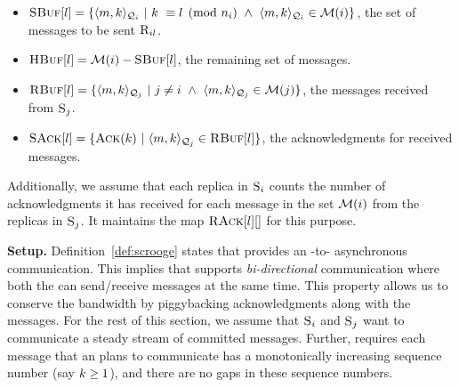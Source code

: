 \begin{itemize}[wide]
\item $\textsc{SBuf}[{l}] = \{\langle m, k\rangle_{\mathcal{Q}_{i}} ~|~ k ~\equiv l \pmod{n_i} ~\wedge ~\langle m, k\rangle_{\mathcal{Q}_{i}} \in \mathcal{M}(i) \}$, the set of messages to be sent $\textsc{R}_{{i}{l}}$.

\item $\textsc{HBuf}[{l}] = \mathcal{M}(i) - \textsc{SBuf}[{l}]$, the remaining set of messages.

\item $\textsc{RBuf}[{l}] = \{\langle m, k\rangle_{\mathcal{Q}_{j}} ~|~ j \neq i ~\wedge ~\langle m, k\rangle_{\mathcal{Q}_{j}} \in \mathcal{M}(j) \}$, the messages received from \RSM{} $\textsc{S}_{j}$.

\item $\textsc{SAck}[{l}] = \{\textsc{Ack}(k) ~|~ \langle m, k\rangle_{\mathcal{Q}_{j}} \in \textsc{RBuf}[{l}] \}$, the acknowledgments for received messages.

\end{itemize}
%
Additionally, we assume that each replica in \RSM{} $\textsc{S}_{i}$ 
counts the number of acknowledgments it has received for 
each message in the set $\mathcal{M}(i)$ from the replicas in \RSM{} $\textsc{S}_{j}$.
It maintains the map $\textsc{RAck}[{l}][{}]$ for this purpose. 


{\bf Setup.}
Definition~\ref{def:scrooge} states that \Scrooge{} provides an \RSM{}-to-\RSM{} asynchronous communication.
This implies that \Scrooge{} supports {\em bi-directional} communication where both the  can send/receive 
messages at the same time.
This property allows us to conserve the bandwidth by piggybacking acknowledgments along with the messages.
For the rest of this section, we assume that  $\textsc{S}_{i}$ and $\textsc{S}_{j}$ want to communicate a 
steady stream of committed messages.
Further, \Scrooge{} requires each message that an \RSM{} plans to communicate has 
a monotonically increasing sequence number (say $k \ge 1$), and there are no gaps in these sequence numbers.



